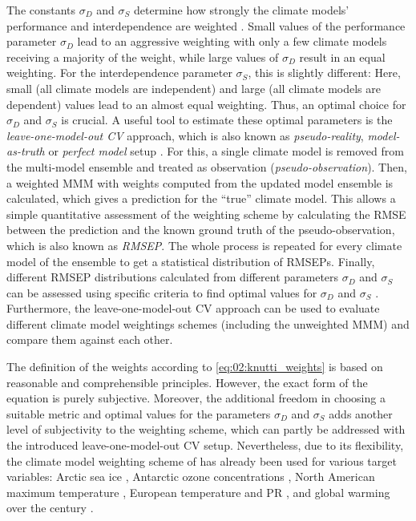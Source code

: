 The constants $\sigma_D$ and $\sigma_S$ determine how strongly the climate
models' performance and interdependence are weighted \autocite{Knutti2017a}.
Small values of the performance parameter $\sigma_D$ lead to an aggressive
weighting with only a few climate models receiving a majority of the weight,
while large values of $\sigma_D$ result in an equal weighting. For the
interdependence parameter $\sigma_S$, this is slightly different: Here, small
(all climate models are independent) and large (all climate models are
dependent) values lead to an almost equal weighting. Thus, an optimal choice
for $\sigma_D$ and $\sigma_S$ is crucial. A useful tool to estimate these
optimal parameters is the \emph{leave-one-model-out \ac{CV}} approach, which is
also known as \emph{pseudo-reality}, \emph{model-as-truth} or \emph{perfect
  model} setup \autocite{Elia2002, Karpechko2013}. For this, a single climate
model is removed from the multi-model ensemble and treated as observation
(\emph{pseudo-observation}). Then, a weighted \ac{MMM} with weights computed
from the updated model ensemble is calculated, which gives a prediction for the
\enquote{true} climate model. This allows a simple quantitative assessment of
the weighting scheme by calculating the \ac{RMSE} between the prediction and
the known ground truth of the pseudo-observation, which is also known as
\emph{\ac{RMSEP}}. The whole process is repeated for every climate model of the
ensemble to get a statistical distribution of \acp{RMSEP}. Finally, different
\ac{RMSEP} distributions calculated from different parameters $\sigma_D$ and
$\sigma_S$ can be assessed using specific criteria to find optimal values for
$\sigma_D$ and $\sigma_S$ \autocite{Knutti2017a}. Furthermore, the
leave-one-model-out \ac{CV} approach can be used to evaluate different climate
model weightings schemes (including the unweighted \ac{MMM}) and compare them
against each other.

The definition of the weights according to \cref{eq:02:knutti_weights} is based
on reasonable and comprehensible principles. However, the exact form of the
equation is purely subjective. Moreover, the additional freedom in choosing a
suitable metric and optimal values for the parameters $\sigma_D$ and $\sigma_S$
adds another level of subjectivity to the weighting scheme, which can partly be
addressed with the introduced leave-one-model-out \ac{CV} setup. Nevertheless,
due to its flexibility, the climate model weighting scheme of
\textcite{Knutti2017a} has already been used for various target variables:
Arctic sea ice \autocite{Knutti2017a}, Antarctic ozone concentrations
\autocite{Amos2020}, North American maximum temperature \autocite{Lorenz2018},
European temperature and \acl{PR} \autocite{Brunner2019, Merrifield2020}, and
global warming over the  century \autocite{Brunner2020, Liang2020a}.


